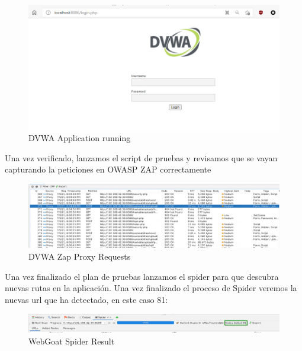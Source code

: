 \begin{figure}[!htb]
    \captionsetup{width=1\linewidth}  
    \includegraphics[width=\linewidth]{./imagenes/04_1_2_01_DVWA_ContainerUP.png}
    \caption{DVWA Application running}  
    \label{fig:DVWA Application running}
\end{figure}
Una vez verificado, lanzamos el script de pruebas y revisamos que se vayan capturando la peticiones en OWASP ZAP correctamente

\begin{figure}[!htb]
    \captionsetup{width=1\linewidth}  
    \includegraphics[width=\linewidth]{./imagenes/04_1_2_02_DVWA_ZapProxyRQST.png}
    \caption{DVWA Zap Proxy Requests}  
    \label{fig:DVWA Zap Proxy Requests}
\end{figure}

Una vez finalizado el plan de pruebas lanzamos el spider para que descubra nuevas rutas en la aplicación. Una vez finalizado
el proceso de Spider veremos la nuevas url que ha detectado, en este caso 81:

\begin{figure}[!htb]
    \captionsetup{width=1\linewidth}  
    \includegraphics[width=\linewidth]{./imagenes/04_1_2_03_DVWA_ZapProxySpiderResult.png}
    \caption{WebGoat Spider Result}  
    \label{fig:DVWA Spider Result}
\end{figure}

